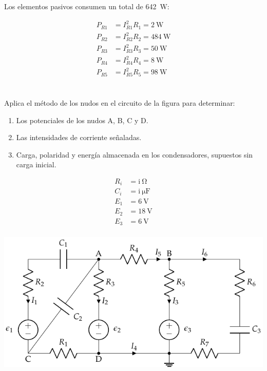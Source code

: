 \documentclass[10pt]{article}
\begin{document}
Los elementos pasivos consumen un total de \SI{642}{\watt}:

\begin{align*}
P_{R1} &= I^2_{R1} R_1 = \SI{2}{\watt}\\
P_{R2} &= I^2_{R2} R_2 = \SI{484}{\watt}\\
P_{R3} &= I^2_{R3} R_3 = \SI{50}{\watt}\\
P_{R4} &= I^2_{R4} R_4 = \SI{8}{\watt}\\
P_{R5} &= I^2_{R5} R_5 = \SI{98}{\watt}
\end{align*}

\clearpage

\section{}
Aplica el método de los nudos en el circuito de la figura para determinar:
\begin{enumerate}
\item Los potenciales de los nudos A, B, C y D.
\item Las intensidades de corriente señaladas.
\item Carga, polaridad y energía almacenada en los condensadores,
  supuestos sin carga inicial.
\end{enumerate}

\begin{minipage}[c]{0.3\textwidth}
  \begin{align*}
    R_i &= \mathrm{i\ } \si{\ohm}\\
    C_i &= \mathrm{i\ } \si{\micro\farad}\\
    E_1 &= \SI{6}{\volt}\\
    E_2 &= \SI{18}{\volt}\\
    E_3 &= \SI{6}{\volt}\\
  \end{align*}
\end{minipage}
\begin{minipage}[c]{0.7\textwidth}
  \includegraphics[width=\textwidth]{../figs/nudos_condensadores.pdf}
\end{minipage}
\end{document}
